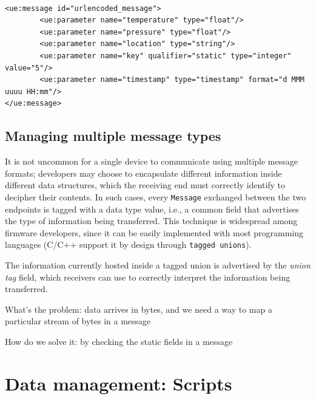\lstset{language=XML}
\begin{lstlisting}[float,floatplacement=!hbt,caption={An URLEncoded message
declaration. Thanks to the custom \texttt{URLEncodedMessageDescriptor}, trying
to create a non-primitive field results in an exception. Note the custom
\texttt{format} attribute on the timestamp field, which is employed to define
the encoding format for dates and times},label={lst:urlencodedmessage}]

<ue:message id="urlencoded_message">
        <ue:parameter name="temperature" type="float"/>
        <ue:parameter name="pressure" type="float"/>
        <ue:parameter name="location" type="string"/>
        <ue:parameter name="key" qualifier="static" type="integer" value="5"/>
        <ue:parameter name="timestamp" type="timestamp" format="d MMM uuuu HH:mm"/>
</ue:message>

\end{lstlisting}


\subsection{Managing multiple message types}

It is not uncommon for a single device to communicate using multiple message
formats; developers may choose to encapsulate different information inside
different data structures, which the receiving end must correctly identify to
decipher their contents. In such cases, every \texttt{Message} exchanged
between the two endpoints is tagged with a data type value, i.e., a common
field that advertises the type of information being transferred. This technique
is widespread among firmware developers, since it can be easily implemented
with most programming languages (C/C++ support it by design through
\texttt{tagged unions}).

The information currently hosted inside a tagged union is advertised by
the \textit{union tag} field, which receivers can use to correctly interpret
the information being transferred. 

What's the problem: data arrives in bytes, and we need a way to map a
particular stream of bytes in a message

How do we solve it: by checking the static fields in a message

\section{Data management: Scripts}
\label{sec:components.script}

